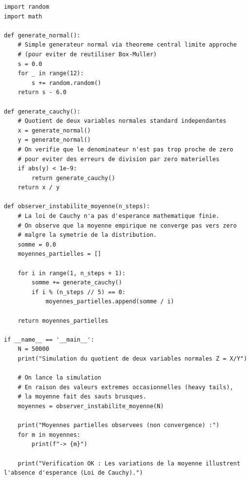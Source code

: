 \documentclass[11pt,a4paper]{article}
\begin{document}
\begin{lstlisting}
import random
import math

def generate_normal():
    # Simple generateur normal via theoreme central limite approche
    # (pour eviter de reutiliser Box-Muller)
    s = 0.0
    for _ in range(12):
        s += random.random()
    return s - 6.0

def generate_cauchy():
    # Quotient de deux variables normales standard independantes
    x = generate_normal()
    y = generate_normal()
    # On verifie que le denominateur n'est pas trop proche de zero
    # pour eviter des erreurs de division par zero materielles
    if abs(y) < 1e-9:
        return generate_cauchy()
    return x / y

def observer_instabilite_moyenne(n_steps):
    # La loi de Cauchy n'a pas d'esperance mathematique finie.
    # On observe que la moyenne empirique ne converge pas vers zero
    # malgre la symetrie de la distribution.
    somme = 0.0
    moyennes_partielles = []

    for i in range(1, n_steps + 1):
        somme += generate_cauchy()
        if i % (n_steps // 5) == 0:
            moyennes_partielles.append(somme / i)

    return moyennes_partielles

if __name__ == '__main__':
    N = 50000
    print("Simulation du quotient de deux variables normales Z = X/Y")

    # On lance la simulation
    # En raison des valeurs extremes occasionnelles (heavy tails),
    # la moyenne fait des sauts brusques.
    moyennes = observer_instabilite_moyenne(N)

    print("Moyennes partielles observees (non convergence) :")
    for m in moyennes:
        print(f"-> {m}")

    print("Verification OK : Les variations de la moyenne illustrent l'absence d'esperance (Loi de Cauchy).")

\end{lstlisting}
\end{document}
